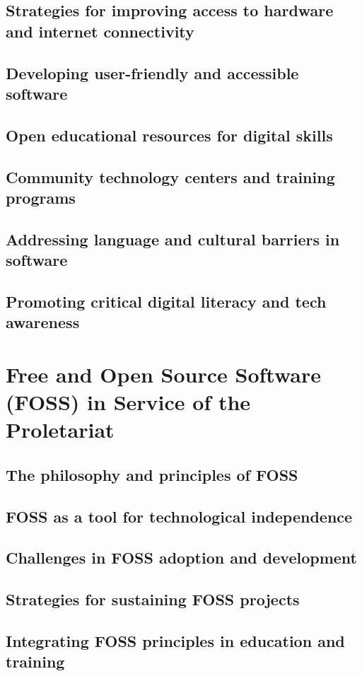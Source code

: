 \subsection{Strategies for improving access to hardware and internet connectivity}
\subsection{Developing user-friendly and accessible software}
\subsection{Open educational resources for digital skills}
\subsection{Community technology centers and training programs}
\subsection{Addressing language and cultural barriers in software}
\subsection{Promoting critical digital literacy and tech awareness}

\newpage

\section{Free and Open Source Software (FOSS) in Service of the Proletariat}
\subsection{The philosophy and principles of FOSS}
\subsection{FOSS as a tool for technological independence}
\subsection{Challenges in FOSS adoption and development}
\subsection{Strategies for sustaining FOSS projects}
\subsection{Integrating FOSS principles in education and training}

